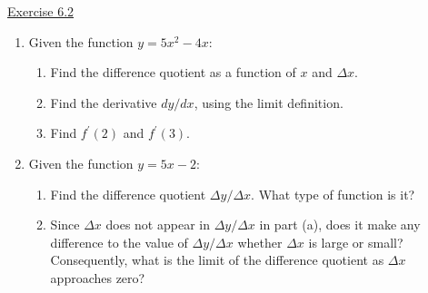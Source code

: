 \underline{Exercise 6.2}
\begin{enumerate}
\item[2.] Given the function $y=5 x^{2}-4 x$:
\begin{enumerate}
\item[(a)] Find the difference quotient as a function of $x$ and $\Delta x$.
\item[(b)] Find the derivative $d y / d x$, using the limit definition.
\item[(c)] Find $f^{\prime}(2)$ and $f^{\prime}(3)$.
\end{enumerate}

\item[3.] Given the function $y=5 x-2$:
\begin{enumerate}
\item[(a)] Find the difference quotient $\Delta y / \Delta x$. What type of function is it?
\item[(b)] Since $\Delta x$ does not appear in $\Delta y / \Delta x$ in part (a), does it make any difference to the value of $\Delta y / \Delta x$ whether $\Delta x$ is large or small? Consequently, what is the limit of the difference quotient as $\Delta x$ approaches zero?
\end{enumerate}
\end{enumerate}
